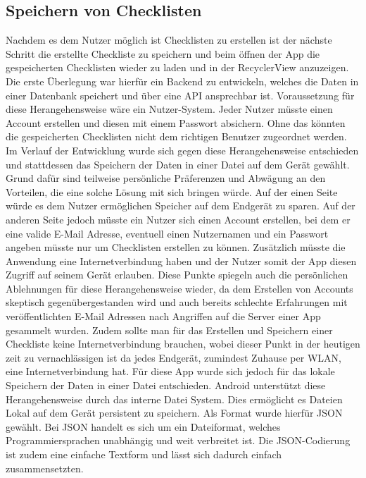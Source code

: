 \subsection{Speichern von Checklisten}\label{subsec:speichereCheckliste}

Nachdem es dem Nutzer möglich ist Checklisten zu erstellen ist der nächste Schritt die erstellte Checkliste zu speichern und beim öffnen der App die gespeicherten Checklisten wieder zu laden und in der RecyclerView anzuzeigen.\\
Die erste Überlegung war hierfür ein Backend zu entwickeln, welches die Daten in einer Datenbank speichert und über eine \ac{API} ansprechbar ist. Voraussetzung für diese Herangehensweise wäre ein Nutzer-System. Jeder Nutzer müsste einen Account erstellen und diesen mit einem Passwort absichern. Ohne das könnten die gespeicherten Checklisten nicht dem richtigen Benutzer zugeordnet werden. Im Verlauf der Entwicklung wurde sich gegen diese Herangehensweise entschieden und stattdessen das Speichern der Daten in einer Datei auf dem Gerät gewählt. Grund dafür sind teilweise persönliche Präferenzen und Abwägung an den Vorteilen, die eine solche Lösung mit sich bringen würde. Auf der einen Seite würde es dem Nutzer ermöglichen Speicher auf dem Endgerät zu sparen. Auf der anderen Seite jedoch müsste ein Nutzer sich einen Account erstellen, bei dem er eine valide E-Mail Adresse, eventuell einen Nutzernamen und ein Passwort angeben müsste nur um Checklisten erstellen zu können. Zusätzlich müsste die Anwendung eine Internetverbindung haben und der Nutzer somit der App diesen Zugriff auf seinem Gerät erlauben. Diese Punkte spiegeln auch die persönlichen Ablehnungen für diese Herangehensweise wieder, da dem Erstellen von Accounts skeptisch gegenübergestanden wird und auch bereits schlechte Erfahrungen mit veröffentlichten E-Mail Adressen nach Angriffen auf die Server einer App gesammelt wurden. Zudem sollte man für das Erstellen und Speichern einer Checkliste keine Internetverbindung brauchen, wobei dieser Punkt in der heutigen zeit zu vernachlässigen ist da jedes Endgerät, zumindest Zuhause per WLAN, eine Internetverbindung hat. Für diese App wurde sich jedoch für das lokale Speichern der Daten in einer Datei entschieden. Android unterstützt diese Herangehensweise durch das interne Datei System. Dies ermöglicht es Dateien Lokal auf dem Gerät persistent zu speichern. Als Format wurde hierfür \ac{JSON} gewählt. Bei \ac{JSON} handelt es sich um ein Dateiformat, welches Programmiersprachen unabhängig und weit verbreitet ist. Die \ac{JSON}-Codierung ist zudem eine einfache Textform und lässt sich dadurch einfach zusammensetzten.\\
